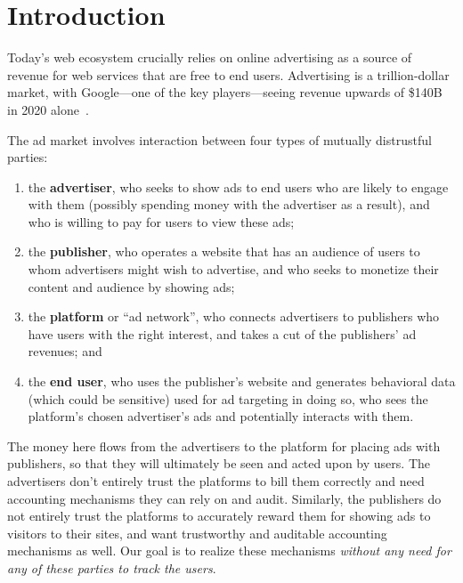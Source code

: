 \section{Introduction}
\label{s:overview}


Today's web ecosystem crucially relies on online advertising as a source of
revenue for web services that are free to end users.
%
Advertising is a trillion-dollar market, with Google---one of the key
players---seeing revenue upwards of \$140B in 2020 alone~\cite{xxx}.
%

The ad market involves interaction between four types of mutually distrustful parties:
\begin{enumerate}
 \item the \textbf{advertiser}, who seeks to show ads to end users who
   are likely to engage with them (possibly spending money with the
   advertiser as a result), and who is willing to pay for users to view
   these ads;
 \item the \textbf{publisher}, who operates a website that has an audience
   of users to whom advertisers might wish to advertise, and who seeks
   to monetize their content and audience by showing ads;
 \item the \textbf{platform} or ``ad network'', who connects advertisers
   to publishers who have users with the right interest, and takes a cut
   of the publishers' ad revenues; and
 \item the \textbf{end user}, who uses the publisher's website and generates
   behavioral data (which could be sensitive) used for ad targeting in doing so,
   who sees the platform's chosen advertiser's ads and potentially interacts
   with them.
\end{enumerate}
%
The money here flows from the advertisers to the platform for placing ads with publishers, so that they will ultimately be seen and acted upon by users.
%
The advertisers don't entirely trust the platforms to bill them correctly and need accounting mechanisms they can rely on and audit.
%
Similarly, the publishers do not entirely trust the platforms to accurately reward them for showing ads to visitors to their sites, and want trustworthy and auditable accounting mechanisms as well.
%
%
%
Our goal is to realize these mechanisms \emph{without any need for any of these parties to track the users}.
%

